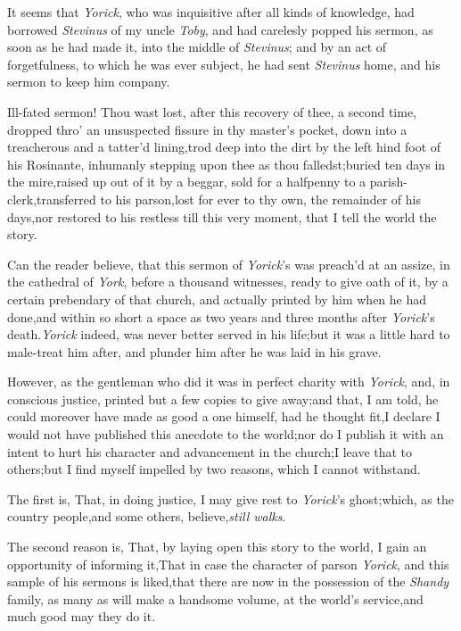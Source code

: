 \documentclass{article}
\begin{document}
It seems that \textit{Yorick}, who was inquisitive after all kinds
of knowledge, had borrowed \textit{Stevinus} of my uncle \textit{Toby},
and had carelesly popped his sermon, as soon as he had made it,
into the middle of \textit{Stevinus}; and by an act of forgetfulness,
to which he was ever subject, he had sent \textit{Stevinus} home, and
his sermon to keep him company.

Ill-fated sermon! Thou wast lost, after this recovery of thee, a
second time, dropped thro’ an unsuspected fissure in thy
master’s pocket, down into a treacherous and a tatter’d
lining,\tsk trod deep into the dirt by the left hind foot of
his Rosinante, inhumanly stepping upon thee as thou
falledst;\tsk buried ten days in the mire,\tsh raised up
out of it by a beggar, sold for a halfpenny to a
parish-clerk,\tsk\break transferred to his
parson,\tsh lost for ever to thy own, the remainder of his
days,\tsk\break nor restored to his restless  till
this very moment, that I tell the world the story.

Can the reader believe, that this sermon of
\textit{Yorick}’s was preach’d at an assize, in the cathedral
of \textit{York}, before a thousand witnesses, ready to give oath of
it, by a certain prebendary of that church, and actually printed by
him when he had done,\tsh and within so short a space as
two years and three months after \textit{Yorick}’s
death.\tsk \textit{Yorick} indeed, was never better served in his
life;\tsh but it was a little hard to male-treat him after,
and plunder him after he was laid in his grave.

However, as the gentleman who did it was in perfect charity with
\textit{Yorick},\tsk\break
and, in conscious justice, printed but a
few copies to give away;\tsk and that, I am told, he could
moreover have made as good a one himself, had he thought
fit,\break \tsk I declare I would not have published this
anecdote to the world;\tsk nor do I publish it with an intent to
hurt his character and advancement in the church;\tsk\break I
leave that to others;\tsh but I find myself impelled by two
reasons, which I cannot withstand.

The first is, That, in doing justice, I may give rest to
\textit{Yorick}’s ghost;\tsk which\break, as the
country people,\tsk and some others, believe,\tsh \textit{still
walks}.

The second reason is, That, by laying open this story to the
world, I gain an opportunity of informing it,\tsk That in case
the character of parson \textit{Yorick}, and this sample of his
sermons is liked,\tsh that
there are now in the possession of
the \textit{Shandy} family, as many as will make a handsome volume,
at the world’s service,\tsh and much good may they\break
do it.
\end{document}
